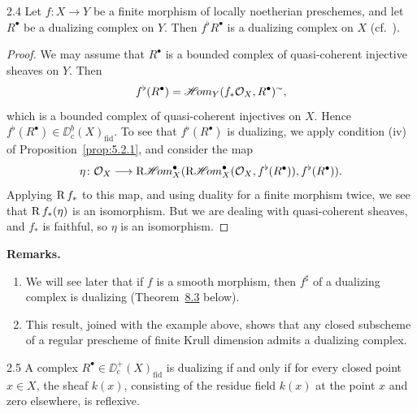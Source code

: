 \begin{bookproposition}{2.4}\label{prop:5.2.4}
Let $f\colon X\to Y$ be a finite morphism of locally noetherian preschemes, and let $R^\bullet$ be a dualizing complex on $Y$. Then $f^{\flat}R^\bullet$ is a dualizing complex on $X$ (cf.\ ).
\end{bookproposition}

\begin{proof}
We may assume that $R^\bullet$ is a bounded complex of quasi-coherent injective sheaves on $Y$. Then
\[
f^{\flat}(R^{\bullet}) = \mathop{\mathscr{H}\!om}\nolimits_{Y}(f_{*}\mathcal{O}_{X},R^{\bullet})^{\sim},
\]
which is a bounded complex of quasi-coherent injectives on $X$. Hence $f^{\flat}(R^{\bullet})\in\DD^{b}_{\mathrm{c}}(X)_{\mathrm{fid}}$. To see that $f^{\flat}(R^{\bullet})$ is dualizing, we apply condition (iv) of Proposition~\ref{prop:5.2.1}, and consider the map
\[
\eta\colon \mathcal{O}_{X}\longrightarrow \mathop{\mathrm{R}\mathscr{H}\!om}\nolimits_{X}^{\bullet}(\mathop{\mathrm{R}\mathscr{H}\!om}\nolimits_{X}^{\bullet}(\mathcal{O}_{X}, f^{\flat}(R^{\bullet})), f^{\flat}(R^{\bullet})).
\]
Applying $\operatorname{R} f_*$ to this map, and using duality for a finite morphism  twice, we see that $\operatorname{R} f_*(\eta)$ is an isomorphism. But we are dealing with quasi-coherent sheaves, and $f_*$ is faithful, so $\eta$ is an isomorphism.
\end{proof}

\par\medskip\noindent\textbf{Remarks.}
\begin{enumerate}
\item We will see later that if $f$ is a smooth morphism, then $f^{\sharp}$ of a dualizing complex is dualizing (Theorem~\hyperref[thm:5.8.3]{8.3} below).
\item This result, joined with the example above, shows that any closed subscheme of a regular prescheme of finite Krull dimension admits a dualizing complex.
\end{enumerate}
\par\medskip

\begin{bookproposition}{2.5}\label{prop:5.2.5}
A complex $R^\bullet\in\DD_{\mathrm{c}}^+(X)_{\mathrm{fid}}$ is dualizing if and only if for every closed point $x\in X$, the sheaf $k(x)$, consisting of the residue field $k(x)$ at the point $x$ and zero elsewhere, is reflexive.
\end{bookproposition}

